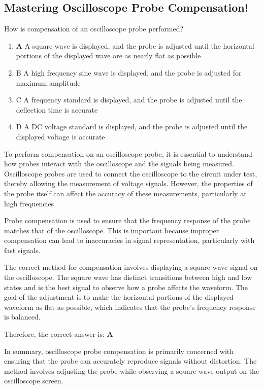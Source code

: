\subsection{Mastering Oscilloscope Probe Compensation!}

\begin{tcolorbox}[colback=gray!10, colframe=black, title=E4A04] How is compensation of an oscilloscope probe performed?
\begin{enumerate}[label=\Alph*.]
    \item \textbf{A} A square wave is displayed, and the probe is adjusted until the horizontal portions of the displayed wave are as nearly flat as possible
    \item B A high frequency sine wave is displayed, and the probe is adjusted for maximum amplitude
    \item C A frequency standard is displayed, and the probe is adjusted until the deflection time is accurate
    \item D A DC voltage standard is displayed, and the probe is adjusted until the displayed voltage is accurate
\end{enumerate} \end{tcolorbox}

To perform compensation on an oscilloscope probe, it is essential to understand how probes interact with the oscilloscope and the signals being measured. Oscilloscope probes are used to connect the oscilloscope to the circuit under test, thereby allowing the measurement of voltage signals. However, the properties of the probe itself can affect the accuracy of these measurements, particularly at high frequencies.

Probe compensation is used to ensure that the frequency response of the probe matches that of the oscilloscope. This is important because improper compensation can lead to inaccuracies in signal representation, particularly with fast signals. 

The correct method for compensation involves displaying a square wave signal on the oscilloscope. The square wave has distinct transitions between high and low states and is the best signal to observe how a probe affects the waveform. The goal of the adjustment is to make the horizontal portions of the displayed waveform as flat as possible, which indicates that the probe's frequency response is balanced. 

Therefore, the correct answer is:
\textbf{A}

In summary, oscilloscope probe compensation is primarily concerned with ensuring that the probe can accurately reproduce signals without distortion. The method involves adjusting the probe while observing a square wave output on the oscilloscope screen.

